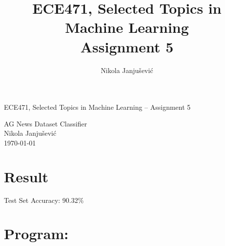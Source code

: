 \documentclass[10pt,a4paper]{article}
\author{Nikola Janju\v{s}evi\'{c}}
\title{ECE471, Selected Topics in Machine Learning \\ Assignment 5}
\begin{document}
\begin{large}
ECE471, Selected Topics in Machine Learning -- Assignment 5 \\
\end{large}
AG News Dataset Classifier \\
Nikola Janju\v{s}evi\'{c} \\
\today

\section*{Result}
Test Set Accuracy: 90.32\%

\section*{Program: }


\end{document}
